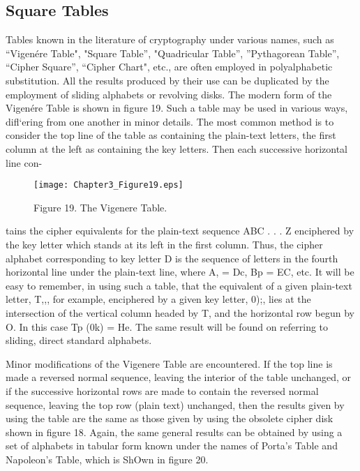 \subsection{Square Tables}

\mypara Tables known in the literature of cryptography under various
names, such as “Vigenére Table", "Square Table”, "Quadricular Table”,
”Pythagorean Table”, “Cipher Square”, “Cipher Chart", etc., are often
employed in polyalphabetic substitution. All the results produced by their
use can be duplicated by the employment of sliding alphabets or revolving disks. The modern form of the Vigenére Table is shown in ﬁgure 19.
Such a table may be used in various ways, diﬂ‘ering from one another in
minor details. The most common method is to consider the top line of
the table as containing the plain-text letters, the ﬁrst column at the left
as containing the key letters. Then each successive horizontal line con-

\begin{figure}[h]
 \centering
 \texttt{[image: Chapter3\_Figure19.eps]}
 \caption{Figure 19. The Vigenere Table.}
\end{figure}

 

tains the cipher equivalents for the plain-text sequence ABC . . . Z enciphered by the key letter which stands at its left in the ﬁrst column.
Thus, the cipher alphabet corresponding to key letter D is the sequence
of letters in the fourth horizontal line under the plain-text line, where
A, = Dc, Bp = EC, etc. It will be easy to remember, in using such a
table, that the equivalent of a given plain-text letter, T,,, for example,
enciphered by a given key letter, 0);, lies at the intersection of the vertical
column headed by T, and the horizontal row begun by O. In this case
Tp (0k) = He. The same result will be found on referring to sliding,
direct standard alphabets.

\mypara Minor modiﬁcations of the Vigenere Table are encountered. If the
top line is made a reversed normal sequence, leaving the interior of the
table unchanged, or if the successive horizontal rows are made to contain
the reversed normal sequence, leaving the top row (plain text) unchanged, then the results given by using the table are the same as those
given by using the obsolete cipher disk shown in ﬁgure 18. Again, the
same general results can be obtained by using a set of alphabets in tabular form known under the names of Porta’s Table and Napoleon’s Table,
which is ShOwn in ﬁgure 20.


